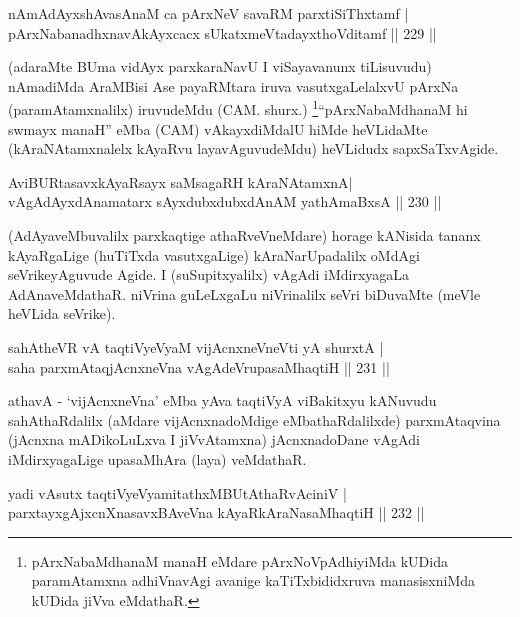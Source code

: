 \begin{shl}
nAmAdAyxshAvasAnaM ca pArx\footnotemark NeV savaRM parxtiSiThxtamf |\\
pArxNabanadhxnavAkAyxcacx sUkatxmeVtadayxthoVditamf \hfill || 229 ||
\end{shl}

\begin{artha}
(adaraMte BUma vidAyx parxkaraNavU I viSayavanunx tiLisuvudu) nAma\-diMda AraMBisi Ase payaRMtara iruva vasutxgaLelalxvU pArxNa (paramAtamxnalilx) iruvu\-deMdu (CAM. shurx.) \footnote{pArxNabaMdhanaM manaH eMdare pArxNoVpAdhiyiMda kUDida paramAtamxna adhiVnavAgi avanige kaTiTxbididxruva manasisxniMda kUDida jiVva eMdathaR.}``pArxNabaMdhanaM hi swmayx manaH'' eMba (CAM) vAkayxdiMdalU hiMde heVLidaMte (kAraNAtamxnalelx kAyaRvu layavAguvudeMdu) heVLidudx sapxSaTxvAgide.
\end{artha}

\begin{shl}
AviBURtasavxkAyaRsayx saMsagaRH kAraNAtamxnA|\\
vAgAdAyxdAnamatarx sAyxdubxdubxdAnAM yathA\s maBxsA \hfill || 230 ||
\end{shl}

\begin{artha}
(AdAyaveMbuvalilx parxkaqtige athaRveVneMdare) horage kANisida tananx kAyaRgaLige (huTiTxda vasutxgaLige) kAraNarUpadalilx oMdAgi seVrikeyAguvude Agide. I (suSupitxyalilx) vAgAdi iMdirxyagaLa AdAnaveMdathaR. niVrina guLeLxgaLu niVrinalilx seVri biDuvaMte (meVle heVLida seVrike).
\end{artha}

\begin{shl}
sahAtheVR vA taqtiVyeVyaM vijAcnxneVneVti yA shurxtA |\\
saha parxmAtaqjAcnxneVna vAgAdeVrupasaMhaqtiH \hfill || 231 ||
\end{shl}

\begin{artha}
athavA - `vijAcnxneVna' eMba yAva taqtiVyA viBakitxyu kANuvudu  sahAthaRdalilx (aMdare vijAcnxnadoMdige eMbathaRdalilxde) parxmAtaqvina (jAcnxna mADikoLuLxva I jiVvAtamxna) jAcnxnadoDane vAgAdi iMdirxyagaLige upasaMhAra (laya) veMdathaR.
\end{artha}

\begin{shl}
yadi vA\s sutx taqtiVyeVyamitathxMBUtAthaRvAciniV |\\
parxtayxgAjxcnXnasavxBAveVna kAyaRkAraNasaMhaqtiH \hfill || 232 ||
\end{shl}

